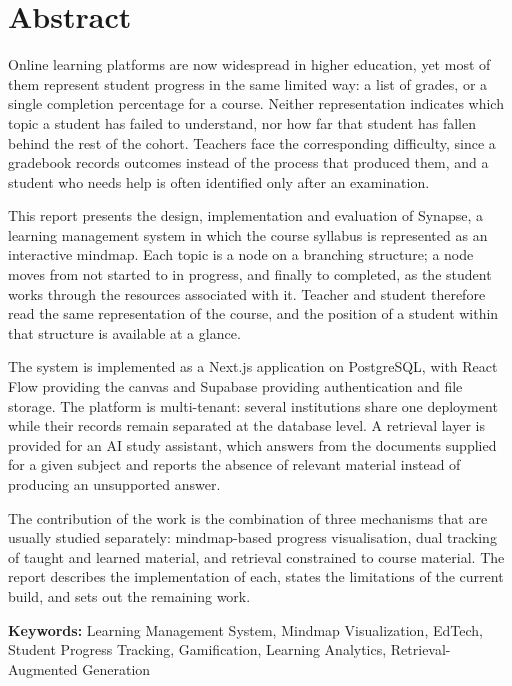 \chapter{Abstract}
\onehalfspacing

Online learning platforms are now widespread in higher education, yet most of them represent student progress in the same limited way: a list of grades, or a single completion percentage for a course. Neither representation indicates which topic a student has failed to understand, nor how far that student has fallen behind the rest of the cohort. Teachers face the corresponding difficulty, since a gradebook records outcomes instead of the process that produced them, and a student who needs help is often identified only after an examination.

This report presents the design, implementation and evaluation of Synapse, a learning management system in which the course syllabus is represented as an interactive mindmap. Each topic is a node on a branching structure; a node moves from not started to in progress, and finally to completed, as the student works through the resources associated with it. Teacher and student therefore read the same representation of the course, and the position of a student within that structure is available at a glance.

The system is implemented as a Next.js application on PostgreSQL, with React Flow providing the canvas and Supabase providing authentication and file storage. The platform is multi-tenant: several institutions share one deployment while their records remain separated at the database level. A retrieval layer is provided for an AI study assistant, which answers from the documents supplied for a given subject and reports the absence of relevant material instead of producing an unsupported answer.

The contribution of the work is the combination of three mechanisms that are usually studied separately: mindmap-based progress visualisation, dual tracking of taught and learned material, and retrieval constrained to course material. The report describes the implementation of each, states the limitations of the current build, and sets out the remaining work.

\textbf{Keywords:} Learning Management System, Mindmap Visualization, EdTech, Student Progress Tracking, Gamification, Learning Analytics, Retrieval-Augmented Generation
